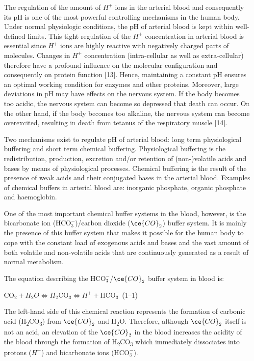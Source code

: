 \documentclass[
  12pt,
  a4paperpaper,
]{report}
\begin{document}
The regulation of the amount of \(H^{+}\) ions in the arterial blood and
consequently its pH is one of the most powerful controlling mechanisms
in the human body. Under normal physiologic conditions, the pH of
arterial blood is kept within well-defined limits. This tight regulation
of the \(H^{+}\) concentration in arterial blood is essential since
\(H^{+}\) ions are highly reactive with negatively charged parts of
molecules. Changes in \(H^{+}\) concentration (intra-cellular as well as
extra-cellular) therefore have a profound influence on the molecular
configuration and consequently on protein function {[}13{]}. Hence,
maintaining a constant pH ensures an optimal working condition for
enzymes and other proteins. Moreover, large deviations in pH may have
effects on the nervous system. If the body becomes too acidic, the
nervous system can become so depressed that death can occur. On the
other hand, if the body becomes too alkaline, the nervous system can
become overexcited, resulting in death from tetanus of the respiratory
muscle {[}14{]}.

Two mechanisms exist to regulate pH of arterial blood: long term
physiological buffering and short term chemical buffering. Physiological
buffering is the redistribution, production, excretion and/or retention
of (non-)volatile acids and bases by means of physiological processes.
Chemical buffering is the result of the presence of weak acids and their
conjugated bases in the arterial blood. Examples of chemical buffers in
arterial blood are: inorganic phosphate, organic phosphate and
haemoglobin.

One of the most important chemical buffer systems in the blood, however,
is the bicarbonate ion (\(\text{HCO}_{3}^{-}\))/carbon dioxide
(\(\ce{CO}_{2}\)) buffer system. It is mainly the presence of this
buffer system that makes it possible for the human body to cope with the
constant load of exogenous acids and bases and the vast amount of both
volatile and non-volatile acids that are continuously generated as a
result of normal metabolism.

The equation describing the \(\text{HCO}_{3}^{-}\)/\(\ce{CO}_{2}\)
buffer system in blood is:

\(\text{CO}_{2} + H_{2}O \Leftrightarrow H_{2}\text{CO}_{3} \Leftrightarrow H^{+} + \text{HCO}_{3}^{-}\)
(1--1)

The left-hand side of this chemical reaction represents the formation of
carbonic acid (H\textsubscript{2}CO\textsubscript{3}) from
\(\ce{CO}_{2}\) and H\textsubscript{2}O. Therefore, although
\(\ce{CO}_{2}\) itself is not an acid, an elevation of the
\(\ce{CO}_{2}\) in the blood increases the acidity of the blood through
the formation of H\textsubscript{2}CO\textsubscript{3} which immediately
dissociates into protons (\(H^{+}\)) and bicarbonate ions
(\(\text{HCO}_{3}^{-}\)).
\end{document}
